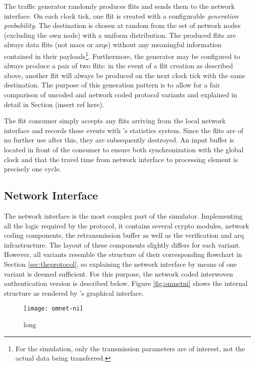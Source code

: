 The traffic generator randomly produces flits and sends them to the network interface. On each clock tick, one flit is created with a configurable
\textit{generation probability}. The destination is chosen at random from the set of network nodes (excluding the own node) with a uniform
distribution. The produced flits are always data flits (not \glspl{mac} or \glspl{arq}) without any meaningful information contained in their
payloads\footnote{For the simulation, only the transmission parameters are of interest, not the actual data being transferred.}. Furthermore, the
generator may be configured to always produce a pair of two flits: in the event of a flit creation as described above, another flit will always be
produced on the next clock tick with the same destination. The purpose of this generation pattern is to allow for a fair comparison of uncoded and
network coded protocol variants and explained in detail in Section (insert ref here).

The flit consumer simply accepts any flits arriving from the local network interface and records these events with \omnet{}'s statistics system. Since
the flits are of no further use after this, they are subsequently destroyed. An input buffer is located in front of the consumer to ensure both
synchronization with the global clock and that the travel time from network interface to processing element is precisely one cycle.

\subsection{Network Interface}
The network interface is the most complex part of the simulator. Implementing all the logic required by the protocol, it contains several crypto
modules, network coding components, the retransmission buffer as well as the verification and \gls{arq} infrastructure. The layout of these components
slightly differs for each variant. However, all variants resemble the structure of their corresponding flowchart in Section \ref{sec:theprotocol}, so
explaining the network interface by means of one variant is deemed sufficient. For this purpose, the network coded interwoven authentication version
is described below. Figure \vref{fig:omnetni} shows the internal structure as rendered by \omnet{}'s graphical interface.

\begin{figure}
    \centering
    \texttt{[image: omnet-ni]}
    \caption[short]{long}
    \label{fig:omnetni}
\end{figure}

